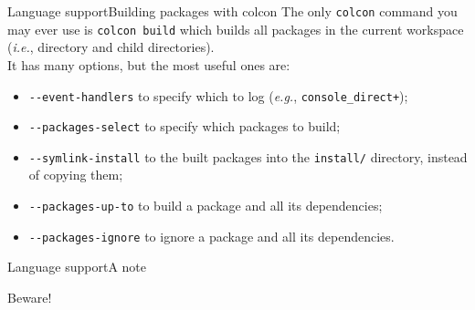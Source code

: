 \begin{frame}{Language support}{Building packages with colcon}
  The only \texttt{colcon} command you may ever use is
  \newline\newline
  \texttt{colcon build}
  \newline\newline
  which builds all packages in the current workspace (\emph{i.e.}, directory and child directories).\\
  It has many options, but the most useful ones are:
  \begin{itemize}
    \item \texttt{-{}-event-handlers} to specify which  to log (\emph{e.g.}, \texttt{console\_direct+});
    \item \texttt{-{}-packages-select} to specify which packages to build;
    \item \texttt{-{}-symlink-install} to  the built packages into the \texttt{install/} directory, instead of copying them;
    \item \texttt{-{}-packages-up-to} to build a package and all its dependencies;
    \item \texttt{-{}-packages-ignore} to ignore a package and all its dependencies.
  \end{itemize}
\end{frame}
\begin{frame}{Language support}{A note}
  \begin{alertblock}{Beware!}
    \centering
  \end{alertblock}
\end{frame}

